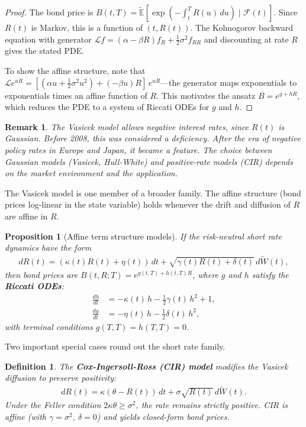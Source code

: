 \documentclass{report}
\theoremstyle{spacedplain}
\newtheorem{proposition}[theorem]{Proposition}
\theoremstyle{spaceddefinition}
\newtheorem{definition}[theorem]{Definition}
\theoremstyle{spacedremark}
\newtheorem{remark}[theorem]{Remark}
\begin{document}
\begin{proof}
The bond price is $B(t,T) = \widetilde{\mathbb{E}}[\exp(-\int_t^T R(u)\,du) \mid \mathcal{F}(t)]$. Since $R(t)$ is Markov, this is a function of $(t,R(t))$. The Kolmogorov backward equation with generator $\mathcal{L}f = (\alpha-\beta R)f_R + \frac{1}{2}\sigma^2 f_{RR}$ and discounting at rate $R$ gives the stated PDE.

To show the affine structure, note that $\mathcal{L}e^{uR} = [(\alpha u + \frac{1}{2}\sigma^2 u^2) + (-\beta u)R]\,e^{uR}$---the generator maps exponentials to exponentials times an affine function of $R$. This motivates the ansatz $B = e^{g + hR}$, which reduces the PDE to a system of Riccati ODEs for $g$ and $h$.
\end{proof}


\begin{remark}
The Vasicek model allows negative interest rates, since $R(t)$ is Gaussian. Before 2008, this was considered a deficiency. After the era of negative policy rates in Europe and Japan, it became a feature. The choice between Gaussian models (Vasicek, Hull-White) and positive-rate models (CIR) depends on the market environment and the application.
\end{remark}

The Vasicek model is one member of a broader family. The affine structure (bond prices log-linear in the state variable) holds whenever the drift and diffusion of $R$ are affine in $R$.

\begin{proposition}[Affine term structure models]
If the risk-neutral short rate dynamics have the form
\begin{align}
    dR(t) = (\kappa(t)R(t) + \eta(t))\,dt + \sqrt{\gamma(t)R(t) + \delta(t)}\,d\widetilde{W}(t),
\end{align}
then bond prices are $B(t,R;T) = e^{g(t,T) + h(t,T)R}$, where $g$ and $h$ satisfy the \textbf{Riccati ODEs}:
\begin{align}
    \frac{dh}{dt} &= -\kappa(t)\,h - \frac{1}{2}\gamma(t)\,h^2 + 1, \\
    \frac{dg}{dt} &= -\eta(t)\,h - \frac{1}{2}\delta(t)\,h^2,
\end{align}
with terminal conditions $g(T,T) = h(T,T) = 0$.
\end{proposition}

Two important special cases round out the short rate family.

\begin{definition}
The \textbf{Cox-Ingersoll-Ross (CIR) model} modifies the Vasicek diffusion to preserve positivity:
\begin{align}
    dR(t) = \kappa(\theta - R(t))\,dt + \sigma\sqrt{R(t)}\,d\widetilde{W}(t).
\end{align}
Under the Feller condition $2\kappa\theta \geq \sigma^2$, the rate remains strictly positive. CIR is affine (with $\gamma = \sigma^2$, $\delta = 0$) and yields closed-form bond prices.
\end{definition}
\end{document}
